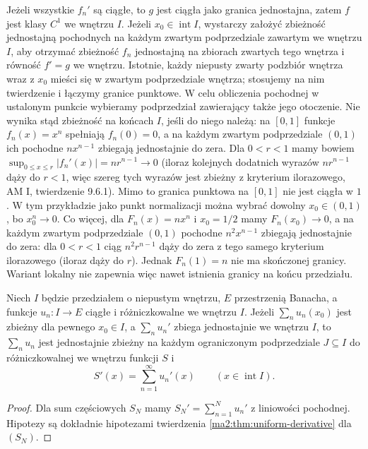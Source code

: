 Jeżeli wszystkie $f_n'$ są ciągłe, to $g$
jest ciągła jako granica jednostajna, zatem $f$
jest klasy $C^1$ we wnętrzu $I$.
Jeżeli $x_0\in\operatorname{int}I$, wystarczy
założyć zbieżność jednostajną pochodnych na
każdym zwartym podprzedziale zawartym we
wnętrzu $I$, aby otrzymać zbieżność $f_n$
jednostajną na zbiorach zwartych tego wnętrza
i równość $f'=g$ we wnętrzu. Istotnie, każdy
niepusty zwarty podzbiór wnętrza wraz z $x_0$
mieści się w zwartym podprzedziale wnętrza;
stosujemy na nim twierdzenie i łączymy
granice punktowe. W celu obliczenia pochodnej
w ustalonym punkcie wybieramy podprzedział
zawierający także jego otoczenie.
Nie wynika stąd zbieżność na końcach $I$,
jeśli do niego należą: na $[0,1]$ funkcje
$f_n(x)=x^n$ spełniają $f_n(0)=0$,
a na każdym zwartym podprzedziale $(0,1)$
ich pochodne $nx^{n-1}$ zbiegają jednostajnie
do zera. Dla $0<r<1$ mamy bowiem
$\sup_{0\le x\le r}|f_n'(x)|=nr^{n-1}\to0$
(iloraz kolejnych dodatnich wyrazów $nr^{n-1}$
dąży do $r<1$, więc szereg tych wyrazów jest
zbieżny z kryterium ilorazowego, AM I,
twierdzenie 9.6.1).
Mimo to granica punktowa na $[0,1]$ nie jest
ciągła w $1$. W tym przykładzie jako punkt
normalizacji można wybrać dowolny $x_0\in(0,1)$,
bo $x_0^n\to0$. Co więcej, dla $F_n(x)=nx^n$
i $x_0=1/2$ mamy $F_n(x_0)\to0$,
a na każdym zwartym podprzedziale $(0,1)$
pochodne $n^2x^{n-1}$ zbiegają jednostajnie
do zera: dla $0<r<1$ ciąg $n^2r^{n-1}$
dąży do zera z tego samego kryterium
ilorazowego (iloraz dąży do $r$).
Jednak $F_n(1)=n$ nie ma skończonej granicy.
Wariant lokalny nie zapewnia więc nawet
istnienia granicy na końcu przedziału.

\begin{wniosek}
\label{ma2:cor:termwise-derivative}
Niech $I$ będzie przedziałem o niepustym
wnętrzu, $E$ przestrzenią Banacha, a funkcje
$u_n:I\to E$ ciągłe i różniczkowalne
we wnętrzu $I$.
Jeżeli $\sum_n u_n(x_0)$ jest zbieżny dla pewnego
$x_0\in I$, a $\sum_n u_n'$ zbiega jednostajnie
we wnętrzu $I$, to $\sum_n u_n$ jest jednostajnie
zbieżny na każdym ograniczonym podprzedziale $J\subseteq I$
do różniczkowalnej we wnętrzu funkcji $S$ i
\[
 S'(x)=\sum_{n=1}^\infty u_n'(x)
 \qquad(x\in\operatorname{int}I).
\]
\end{wniosek}
\begin{proof}
Dla sum częściowych $S_N$ mamy
$S_N'=\sum_{n=1}^N u_n'$ z liniowości pochodnej.
Hipotezy są dokładnie hipotezami twierdzenia
\ref{ma2:thm:uniform-derivative} dla $(S_N)$.
\end{proof}

